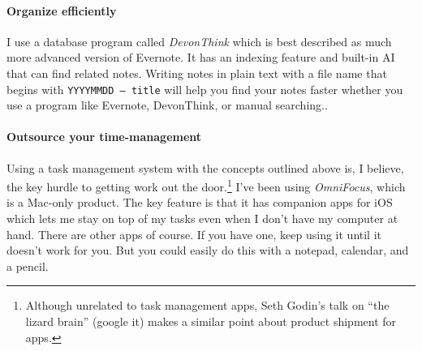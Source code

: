\documentclass{tufte-handout}
\begin{document}
\paragraph{Organize efficiently}

I use a database program called \textit{DevonThink} which is best
described as much more advanced version of Evernote. It has an
indexing feature and built-in AI that can find related notes. Writing
notes in plain text with a file name that begins with \texttt{YYYYMMDD
  -- title} will help you find your notes faster whether you use a
program like Evernote, DevonThink, or manual
searching..

\paragraph{Outsource your time-management}

Using a task management system with the concepts outlined above is, I
believe, the key hurdle to getting work out the
door.\footnote{Although unrelated to task management apps, Seth
  Godin's talk on ``the lizard brain'' (google it) makes a similar
  point about product shipment for apps.} I've been using
\textit{OmniFocus}, which is a Mac-only product. The key feature is
that it has companion apps for iOS which lets me stay on top of my
tasks even when I don't have my computer at hand. There are other
apps of course. If you have one, keep using it until it doesn't work
for you. But you could easily do this with a notepad, calendar, and a
pencil.  


\nocite{*}

\renewcommand{\bibname}{Further Reading} 


\end{document}
